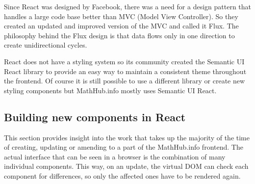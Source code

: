 \documentclass[11pt,a4paper]{article}
\begin{document}
Since React was designed by Facebook, there was a need for a design pattern that handles a large code base better than MVC (Model View Controller).
So they created an updated and improved version of the MVC and called it Flux.
The philosophy behind the Flux design is that data flows only in one direction to create unidirectional cycles. \cite{flux}

React does not have a styling system so its community created the Semantic UI React library to provide an easy way to maintain a consistent theme throughout the frontend.
Of course it is still possible to use a different library or create new styling components but MathHub.info mostly uses Semantic UI React.

\subsection{Building new components in React} \label{components} 
This section provides insight into the work that takes up the majority of the time of creating, updating or amending to a part of the MathHub.info frontend. 
The actual interface that can be seen in a browser is the combination of many individual components.
This way, on an update, the virtual DOM can check each component for differences, so only the affected ones have to be rendered again.
\end{document}
